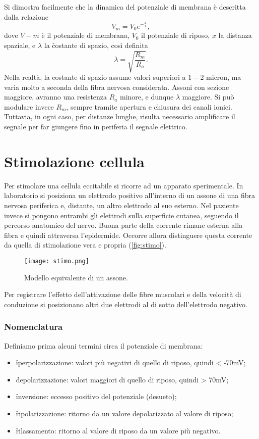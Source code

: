 Si dimostra facilmente che la dinamica del potenziale di membrana è descritta dalla relazione
\begin{equation*}
    V_m = V_0 e^{-\frac{x}{\lambda}},
\end{equation*}
dove $V-m$ è il potenziale di membrana, $V_0$ il potenziale di riposo, $x$ la distanza spaziale, e $\lambda$ la \h{costante di spazio}, così definita
\begin{equation}
    \label{eq:lambda}
    \lambda = \sqrt{\frac{R_m}{R_a}}.
\end{equation}
Nella realtà, la costante di spazio assume valori superiori a $1-2$ micron, ma varia molto a seconda della fibra nervosa considerata. Assoni con sezione maggiore, avranno una resistenza $R_a$ minore, e dunque $\lambda$ maggiore. Si può modulare invece $R_m$, sempre tramite apertura e chiusura dei canali ionici. Tuttavia, in ogni caso, per distanze lunghe, risulta necessario amplificare il segnale per far giungere fino in periferia il segnale elettrico. 


\section{Stimolazione cellula}
Per stimolare una cellula eccitabile si ricorre ad un apparato sperimentale. In laboratorio si posiziona un elettrodo positivo all'interno di un assone di una fibra nervosa periferica e, distante, un altro elettrodo al suo esterno. Nel paziente invece si pongono entrambi gli elettrodi sulla superficie cutanea, seguendo il percorso anatomico del nervo. Buona parte della corrente rimane esterna alla fibra e quindi attraversa l'epidermide. Occorre allora distinguere questa corrente da quella di stimolazione vera e propria (\autoref{fig:stimo}).

\begin{figure}[h]
    \centering
    \texttt{[image: stimo.png]}
    \caption{Modello equivalente di un assone.}
    \label{fig:stimo}
\end{figure}

Per registrare l'effetto dell'attivazione delle fibre muscolari e della velocità di conduzione si posizionano altri due elettrodi al di sotto dell'elettrodo negativo.

\subsubsection{Nomenclatura}
Definiamo prima alcuni termini circa il potenziale di membrana:
\begin{itemize}
    \item \h{iperpolarizzazione}: valori più negativi di quello di riposo, quindi < -70mV;
    \item \h{depolarizzazione}: valori maggiori di quello di riposo, quindi > 70mV;
    \item \h{inversione}: eccesso positivo del potenziale (desueto);
    \item \h{ripolarizzazione}: ritorno da un valore depolarizzato al valore di riposo;
    \item \h{rilassamento}: ritorno al valore di riposo da un valore più negativo.
\end{itemize}

